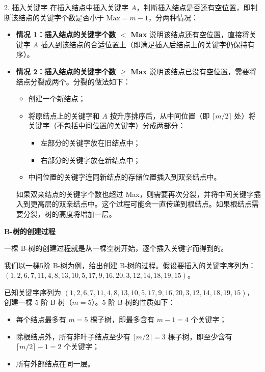 \documentclass[lang=cn,newtx,10pt,scheme=chinese]{../elegantbook}
\begin{document}
2. 插入关键字  
   在插入结点中插入关键字 $A$，判断插入结点是否还有空位置，即判断该结点的关键字个数是否小于 $\text{Max} = m-1$，分两种情况：
   \begin{itemize}
     \item \textbf{情况 1：插入结点的关键字个数 $<$ Max}  
       说明该结点还有空位置，直接将关键字 $A$ 插入到该结点的合适位置上（即满足插入后结点上的关键字仍保持有序）。
     \item \textbf{情况 2：插入结点的关键字个数 $\geq$ Max}  
       说明该结点已没有空位置，需要将结点分裂成两个。分裂的做法如下：
       \begin{itemize}
         \item 创建一个新结点；
         \item 将原结点上的关键字和 $A$ 按升序排序后，从中间位置（即 $\lceil m/2 \rceil$ 处）将关键字（不包括中间位置的关键字）分成两部分：
           \begin{itemize}
             \item 左部分的关键字放在旧结点中；
             \item 右部分的关键字放在新结点中；
           \end{itemize}
         \item 中间位置的关键字连同新结点的存储位置插入到双亲结点中。
       \end{itemize}
       如果双亲结点的关键字个数也超过 Max，则需要再次分裂，并将中间关键字插入到更高层的双亲结点中。这个过程可能会一直传递到根结点。如果根结点需要分裂，树的高度将增加一层。
   \end{itemize}


\textbf{B-树的创建过程}  

一棵 B-树的创建过程就是从一棵空树开始，逐个插入关键字而得到的。

我们以一棵5阶 B-树为例，给出创建 B-树的过程。假设要插入的关键字序列为：$(1, 2, 6, 7, 11, 4, 8, 13, 10, 5, 17, 9, 16, 20, 3, 12, 14, 18, 19, 15)$。

已知关键字序列为 $(1, 2, 6, 7, 11, 4, 8, 13, 10, 5, 17, 9, 16, 20, 3, 12, 14, 18, 19, 15)$，创建一棵 5 阶 B-树（$m=5$）。5 阶 B-树的性质如下：
\begin{itemize}
  \item 每个结点最多有 $m = 5$ 棵子树，即最多含有 $m-1 = 4$ 个关键字；
  \item 除根结点外，所有非叶子结点至少有 $\lceil m/2 \rceil = 3$ 棵子树，即至少含有 $\lceil m/2 \rceil - 1 = 2$ 个关键字；
  \item 所有外部结点在同一层。
\end{itemize}
\end{document}
